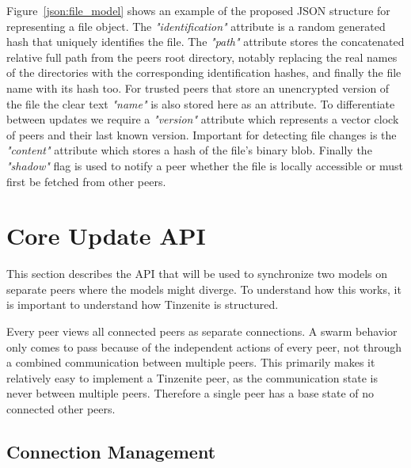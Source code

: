 Figure~\ref{json:file_model} shows an example of the proposed JSON structure for representing a file object.
The \textit{"identification"} attribute is a random generated hash that uniquely identifies the file.
The \textit{"path"} attribute stores the concatenated relative full path from the peers root directory, notably replacing the real names of the directories with the corresponding identification hashes, and finally the file name with its hash too.
For trusted peers that store an unencrypted version of the file the clear text \textit{"name"} is also stored here as an attribute.
To differentiate between updates we require a \textit{"version"} attribute which represents a vector clock of peers and their last known version.
Important for detecting file changes is the \textit{"content"} attribute which stores a hash of the file's binary blob.
Finally the \textit{"shadow"} flag is used to notify a peer whether the file is locally accessible or must first be fetched from other peers.

\section{Core Update API}

This section describes the API that will be used to synchronize two models on separate peers where the models might diverge.
To understand how this works, it is important to understand how Tinzenite is structured.

Every peer views all connected peers as separate connections.
A swarm behavior only comes to pass because of the independent actions of every peer, not through a combined communication between multiple peers.
This primarily makes it relatively easy to implement a Tinzenite peer, as the communication state is never between multiple peers.
Therefore a single peer has a base state of no connected other peers.

\subsection{Connection Management}
\label{sec:conn_management}

